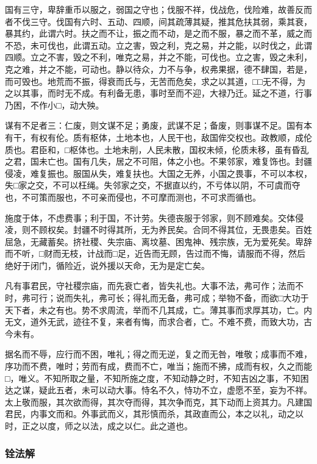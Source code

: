 \documentclass[]{article}
\begin{document}
国有三守，卑辞重币以服之，弱国之守也；伐服不祥，伐战危，伐险难，故善反而者不伐三守。伐国有六时、五动、四顺，间其疏薄其疑，推其危扶其弱，乘其衰，暴其约，此谓六时。扶之而不让，振之而不动，是之而不服，暴之而不革，威之而不恐，未可伐也，此谓五动。立之害，毁之利，克之易，并之能，以时伐之，此谓四顺。立之不害，毁之不利，唯克之易，并之不能，可伐也。立之害，毁之未利，克之难，并之不能，可动也。静以待众，力不与争，权弗果据，德不肆国，若是，而可毁也。地荒而不振，得衰而氏与，无苦而危矣，求之以其道，□□无不得，为之以其事，而时无不成。有利备无患，事时至而不迎，大禄乃迁。延之不道，行事乃困，不作小□，动大殃。

谋有不足者三：仁废，则文谋不足；勇废，武谋不足；备废，则事谋不足。国有本有干，有权有伦。质有枢体，土地本也，人民干也，敌国侔交权也。政教顺，成伦质也。君臣和，□枢体也。土地未削，人民未散，国权未倾，伦质未移，虽有昏乱之君，国未亡也。国有几失，居之不可阻，体之小也。不果邻家，难复饰也。封疆侵凌，难复振也。服国从失，难复扶也。大国之无养，小国之畏事，不可以本权，失□家之交，不可以枉绳。失邻家之交，不据直以约，不亏体以阴，不可虞而夺也，不可策而服也，不可亲而侵也，不可摩而测也，不可求而循也。

施度于体，不虑费事；利于国，不计劳。失德丧服于邻家，则不顾难矣。交体侵凌，则不顾权矣。封疆不时得其所，无为养民矣。合同不得其位，无畏患矣。百姓屈急，无藏蓄矣。挤社稷、失宗庙、离坟墓、困鬼神、残宗族，无为爱死矣。卑辞而不听，□财而无枝，计战而□足，近告而无顾，告过而不悔，请服而不得，然后绝好于闭门，循险近，说外援以天命，无为是定亡矣。

凡有事君民，守社稷宗庙，而先衰亡者，皆失礼也。大事不法，弗可作；法而不时，弗可行；说而失礼，弗可长；得礼而无备，弗可成；举物不备，而欲□大功于天下者，未之有也。势不求周流，举而不几其成，亡。薄其事而求厚其功，亡。内无文，道外无武，迹往不复，来者有悔，而求合者，亡。不难不费，而致大功，古今未有。

据名而不辱，应行而不困，唯礼；得之而无逆，复之而无咎，唯敬；成事而不难，序功而不费，唯时；劳而有成，费而不亡，唯当；施而不拂，成而有权，久之而能□，唯义。不知所取之量，不知所施之度，不知动静之时，不知吉凶之事，不知困达之谋，疑此五者，未可以动大事。恃名不久，恃功不立，虚愿不至，妄为不祥。太上敬而服，其次欲而得，其次夺而得，其次争而克，其下动而上资其力。凡建国君民，内事文而和。外事武而义，其形慎而杀，其政直而公，本之以礼，动之以时，正之以度，师之以法，成之以仁。此之道也。

\hypertarget{header-n379}{%
\subsubsection{铨法解}\label{header-n379}}
\end{document}
